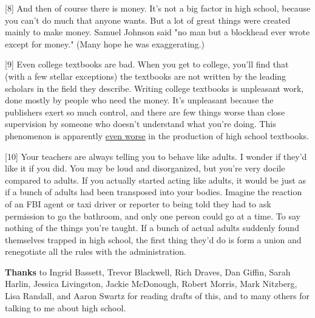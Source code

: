 [8]
                  And then of course there is money. It's not a big factor in
                  high school, because you can't do much that anyone wants. But
                  a lot of great things were created mainly to make money.
                  Samuel Johnson said "no man but a blockhead ever wrote except
                  for money." (Many hope he was exaggerating.)

[9]
                  Even college textbooks are bad. When you get to college,
                  you'll find that (with a few stellar exceptions) the textbooks
                  are not written by the leading scholars in the field they
                  describe. Writing college textbooks is unpleasant work, done
                  mostly by people who need the money. It's unpleasant because
                  the publishers exert so much control, and there are few things
                  worse than close supervision by someone who doesn't understand
                  what you're doing. This phenomenon is apparently
                  \href{http://www.edutopia.org/muddle-machine}{even worse}
                  in the production of high school textbooks.

[10]
                  Your teachers are always telling you to behave like adults. I
                  wonder if they'd like it if you did. You may be loud and
                  disorganized, but you're very docile compared to adults. If
                  you actually started acting like adults, it would be just as
                  if a bunch of adults had been transposed into your bodies.
                  Imagine the reaction of an FBI agent or taxi driver or
                  reporter to being told they had to ask permission to go the
                  bathroom, and only one person could go at a time. To say
                  nothing of the things you're taught. If a bunch of actual
                  adults suddenly found themselves trapped in high school, the
                  first thing they'd do is form a union and renegotiate all the
                  rules with the administration.

\textbf{Thanks} to
                  Ingrid Bassett, Trevor Blackwell, Rich Draves, Dan Giffin,
                  Sarah Harlin, Jessica Livingston, Jackie McDonough, Robert
                  Morris, Mark Nitzberg, Lisa Randall, and Aaron Swartz for
                  reading drafts of this, and to many others for talking to me
                  about high school.


              
            
          
